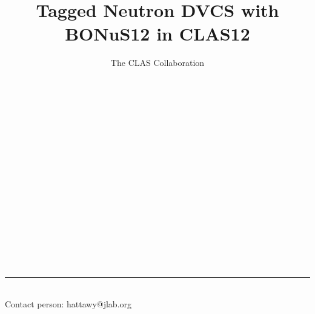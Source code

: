 \documentclass[11pt]{article}
\title{\textbf{Tagged Neutron DVCS with BONuS12 in CLAS12}}
\author{The CLAS Collaboration}
\renewenvironment{abstract}
 {\small
  \begin{center}
  \bfseries \abstractname\vspace{-.5em}\vspace{0pt}
  \end{center}
  \list{}{%
    \setlength{\leftmargin}{5mm}%
    \setlength{\rightmargin}{\leftmargin}%
  }%
  \item\relax}
 {\endlist}
\begin{document}
\maketitle

\begin{abstract}
  
\end{abstract}
~\\
~\\
~\\
~\\
~\\
~\\
~\\
~\\
~\\
~\\
~\\
~\\
~\\
~\\
\medskip\hrule height 1pt
~\\
Contact person: hattawy@jlab.org
\end{document}
